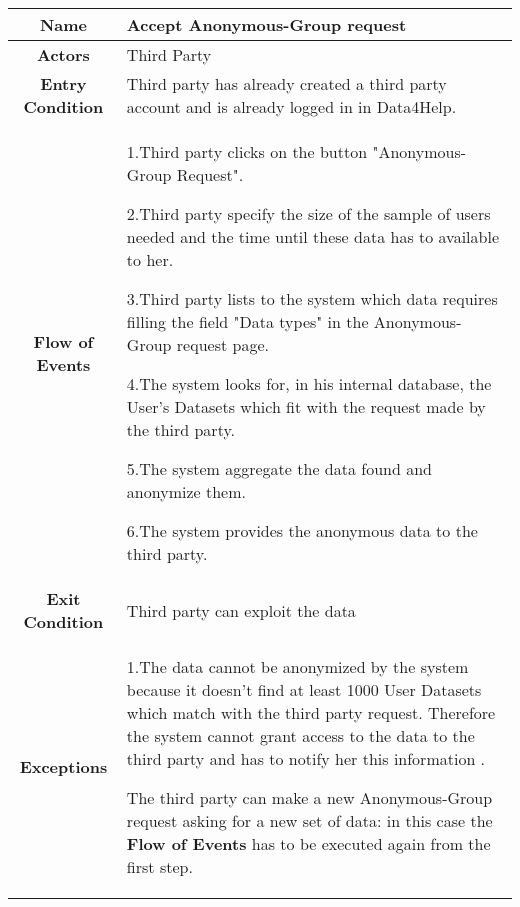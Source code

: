       \begin{table}[h!]
        \centering
        \begin{tabularx}{\linewidth}{|c|X|}
          \hline

          \textbf{Name} & Accept Anonymous-Group request\\
        	\hline

        	\textbf{Actors} & Third Party\\
        	\hline

        	\textbf{Entry Condition} & Third party has already created a third party account and is already logged in in Data4Help.\\
        	\hline

        	\textbf{Flow of Events} &
        					1.Third party clicks on the button "Anonymous-Group Request".

					2.Third party specify the size of the sample of users needed and the time until these data has to 						available to her.

        					3.Third party lists to the system which data requires filling the field "Data types" in the 							Anonymous-Group request page.

        					4.The system looks for, in his internal database, the User's Datasets  which fit with the request 						made by the third party.

        					5.The system aggregate the data found and anonymize them.

        					6.The system provides the anonymous data to the third party.\\
        	\hline

        	\textbf{Exit Condition} & Third party can exploit the data \\

        	\hline

        	\textbf{Exceptions} & 1.The data cannot be anonymized  by the system because it doesn't find at least 1000 							User Datasets which match with the third party request. Therefore the system cannot 							grant access to the data to the third party and has to notify her this information .

        				The third party can make a new Anonymous-Group request asking for a new set of data: 							in this case the \textbf{Flow of Events} has to be executed again from the first step.\\

      
    \hline
     
   \end{tabularx}
  
    \end{table}





